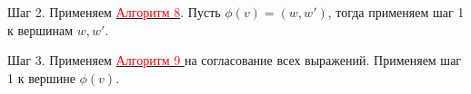 \documentclass[12pt]{article}
\begin{document}
     Шаг 2. Применяем  \hyperlink{a8}{ \textcolor{red}{Алгоритм 8}}. Пусть $\phi(v)=(w,w')$, тогда применяем шаг 1 к вершинам $w, w'$.
     
     Шаг 3. Применяем  \hyperlink{a9}{ \textcolor{red}{Алгоритм 9 }} на согласование  всех выражений. Применяем шаг 1 к вершине $\phi(v)$.
     
     
     
     
     
\end{document}
